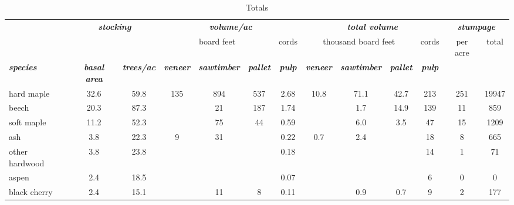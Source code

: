 \documentclass[landscape]{article}
\begin{document}
\begin{table}[H]

\caption{\label{tab:unnamed-chunk-16}Totals}
\fontsize{10}{12}\selectfont
\begin{tabular}[t]{lcccccccccccc}
\toprule
\multicolumn{1}{c}{\em{\textbf{ }}} & \multicolumn{2}{c}{\em{\textbf{stocking}}} & \multicolumn{4}{c}{\em{\textbf{volume/ac }}} & \multicolumn{4}{c}{\em{\textbf{total volume}}} & \multicolumn{2}{c}{\em{\textbf{stumpage}}} \\
\cmidrule(l{3pt}r{3pt}){2-3} \cmidrule(l{3pt}r{3pt}){4-7} \cmidrule(l{3pt}r{3pt}){8-11} \cmidrule(l{3pt}r{3pt}){12-13}
\multicolumn{3}{c}{ } & \multicolumn{3}{c}{board feet} & \multicolumn{1}{c}{cords} & \multicolumn{3}{c}{thousand board feet} & \multicolumn{1}{c}{cords} & \multicolumn{1}{c}{per acre} & \multicolumn{1}{c}{total} \\
\cmidrule(l{3pt}r{3pt}){4-6} \cmidrule(l{3pt}r{3pt}){7-7} \cmidrule(l{3pt}r{3pt}){8-10} \cmidrule(l{3pt}r{3pt}){11-11} \cmidrule(l{3pt}r{3pt}){12-12} \cmidrule(l{3pt}r{3pt}){13-13}
\rowcolor[HTML]{DCDCDC}  \em{\textbf{species}} & \em{\textbf{basal area}} & \em{\textbf{trees/ac}} & \em{\textbf{veneer}} & \em{\textbf{sawtimber}} & \em{\textbf{pallet}} & \em{\textbf{pulp}} & \em{\textbf{veneer}} & \em{\textbf{sawtimber}} & \em{\textbf{pallet}} & \em{\textbf{pulp}} & \em{\textbf{ }} & \em{\textbf{ }}\\
\midrule
\rowcolor{gray!6}  hard maple & 32.6 & 59.8 & 135 & 894 & 537 & 2.68 & 10.8 & 71.1 & 42.7 & 213 & 251 & 19947\\
 
beech & 20.3 & 87.3 &  & 21 & 187 & 1.74 &  & 1.7 & 14.9 & 139 & 11 & 859\\
 
\rowcolor{gray!6}  soft maple & 11.2 & 52.3 &  & 75 & 44 & 0.59 &  & 6.0 & 3.5 & 47 & 15 & 1209\\
 
ash & 3.8 & 22.3 & 9 & 31 &  & 0.22 & 0.7 & 2.4 &  & 18 & 8 & 665\\
 
\rowcolor{gray!6}  other hardwood & 3.8 & 23.8 &  &  &  & 0.18 &  &  &  & 14 & 1 & 71\\
 
aspen & 2.4 & 18.5 &  &  &  & 0.07 &  &  &  & 6 & 0 & 0\\
 
\rowcolor{gray!6}  black cherry & 2.4 & 15.1 &  & 11 & 8 & 0.11 &  & 0.9 & 0.7 & 9 & 2 & 177\\
 

\end{tabular}
\end{table}
\end{document}
